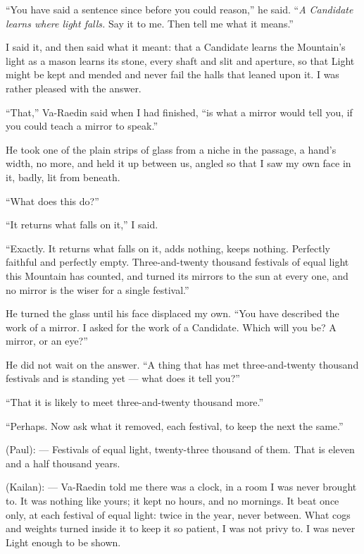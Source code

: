 ``You have said a sentence since before you could reason,'' he said. ``\textit{A Candidate learns where light falls.} Say it to me. Then tell me what it means.''\par

I said it, and then said what it meant: that a Candidate learns the Mountain's light as a mason learns its stone, every shaft and slit and aperture, so that Light might be kept and mended and never fail the halls that leaned upon it. I was rather pleased with the answer.\par

``That,'' Va-Raedin said when I had finished, ``is what a mirror would tell you, if you could teach a mirror to speak.''\par

He took one of the plain strips of glass from a niche in the passage, a hand's width, no more, and held it up between us, angled so that I saw my own face in it, badly, lit from beneath.\par

``What does this do?''\par
``It returns what falls on it,'' I said.\par
``Exactly. It returns what falls on it, adds nothing, keeps nothing. Perfectly faithful and perfectly empty. Three-and-twenty thousand festivals of equal light this Mountain has counted, and turned its mirrors to the sun at every one, and no mirror is the wiser for a single festival.''\par

He turned the glass until his face displaced my own. ``You have described the work of a mirror. I asked for the work of a Candidate. Which will you be? A mirror, or an eye?''\par

He did not wait on the answer. ``A thing that has met three-and-twenty thousand festivals and is standing yet --- what does it tell you?''\par

``That it is likely to meet three-and-twenty thousand more.''\par

``Perhaps. Now ask what it removed, each festival, to keep the next the same.''\par

\begin{room}

(Paul): --- Festivals of equal light, twenty-three thousand of them. That is eleven and a half thousand years. 

(Kailan): --- Va-Raedin told me there was a clock, in a room I was never brought to. It was nothing like yours; it kept no hours, and no mornings. It beat once only, at each festival of equal light: twice in the year, never between. What cogs and weights turned inside it to keep it so patient, I was not privy to. I was never Light enough to be shown.

\end{room}

